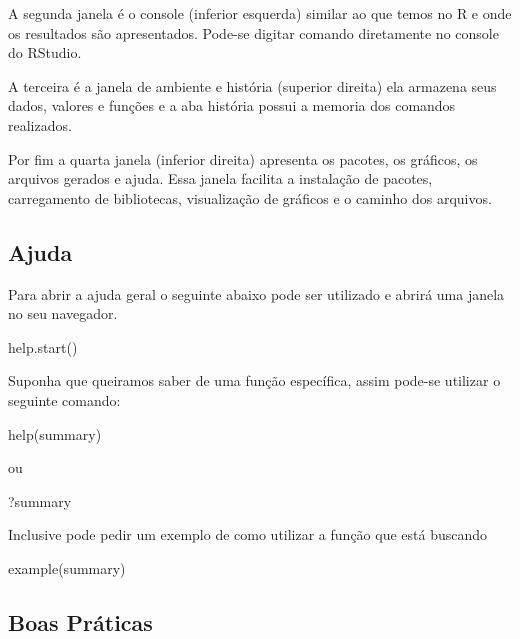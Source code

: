\documentclass[
  letterpaper,
  DIV=11,
  numbers=noendperiod]{scrreprt}
\newenvironment{Shaded}{\begin{snugshade}}{\end{snugshade}}
\newcommand{\FunctionTok}[1]{\textcolor[rgb]{0.28,0.35,0.67}{#1}}
\newcommand{\NormalTok}[1]{\textcolor[rgb]{0.00,0.23,0.31}{#1}}
\begin{document}
A segunda janela é o console (inferior esquerda) similar ao que temos no
R e onde os resultados são apresentados. Pode-se digitar comando
diretamente no console do RStudio.

A terceira é a janela de ambiente e história (superior direita) ela
armazena seus dados, valores e funções e a aba história possui a memoria
dos comandos realizados.

Por fim a quarta janela (inferior direita) apresenta os pacotes, os
gráficos, os arquivos gerados e ajuda. Essa janela facilita a instalação
de pacotes, carregamento de bibliotecas, visualização de gráficos e o
caminho dos arquivos.

\subsection{Ajuda}\label{ajuda}

Para abrir a ajuda geral o seguinte abaixo pode ser utilizado e abrirá
uma janela no seu navegador.

\begin{Shaded}
\begin{Highlighting}[]
\FunctionTok{help.start}\NormalTok{()}
\end{Highlighting}
\end{Shaded}

Suponha que queiramos saber de uma função específica, assim pode-se
utilizar o seguinte comando:

\begin{Shaded}
\begin{Highlighting}[]
\FunctionTok{help}\NormalTok{(summary)}
\end{Highlighting}
\end{Shaded}

ou

\begin{Shaded}
\begin{Highlighting}[]
\NormalTok{?summary}
\end{Highlighting}
\end{Shaded}

Inclusive pode pedir um exemplo de como utilizar a função que está
buscando

\begin{Shaded}
\begin{Highlighting}[]
\FunctionTok{example}\NormalTok{(summary)}
\end{Highlighting}
\end{Shaded}

\subsection{Boas Práticas}\label{boas-pruxe1ticas}
\end{document}
